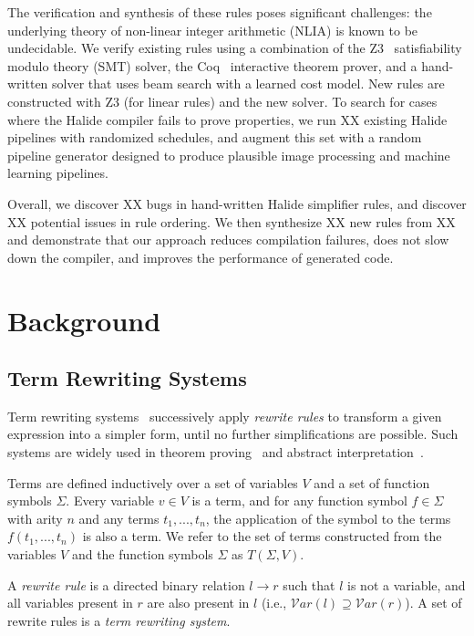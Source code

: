\documentclass[sigplan,review,anonymous]{acmart}\settopmatter{printfolios=true,printccs=false,printacmref=false}
\newcommand{\NumApps}{{\color{red} XX}\xspace}
\newcommand{\NumRulesFixed}{{\color{red} XX}\xspace}
\newcommand{\NumOrderingProblems}{{\color{red} XX}\xspace}
\newcommand{\NumRulesSynthesized}{{\color{red} XX}\xspace}
\newcommand{\NumFailureExamples}{{\color{red} XX}\xspace}
\begin{document}
The verification and synthesis
of these rules poses significant challenges: the underlying theory of non-linear integer arithmetic (NLIA)
is known to be undecidable.  We verify existing rules using a combination of the Z3~\cite{de2008z3} satisfiability
modulo theory (SMT) solver, the Coq~\cite{coq19} interactive theorem prover, and a hand-written solver
that uses beam search with a learned cost model.  New rules are constructed with Z3 (for linear rules)
and the new solver.  To search for cases where the Halide compiler fails to prove properties, we run
\NumApps existing Halide pipelines with randomized schedules, and augment this set with a random pipeline
generator designed to produce plausible image processing and machine learning pipelines.

Overall, we discover \NumRulesFixed bugs in hand-written Halide simplifier rules, and discover \NumOrderingProblems
potential issues in rule ordering.  We then synthesize \NumRulesSynthesized new rules from \NumFailureExamples and
demonstrate that our approach reduces compilation failures, does not slow down the compiler, and improves
the performance of generated code.

\section{Background}
\subsection{Term Rewriting Systems}
Term rewriting systems~\cite{gorn1967} successively apply \textit{rewrite rules} to transform a given
expression into a simpler form, until no further simplifications are possible.  Such systems are widely
used in theorem proving~\cite{} and abstract interpretation~\cite{}.

Terms are defined inductively over a set of variables $V$ and a set of function symbols $\Sigma$. Every variable $v \in V$ is a term, and for any function symbol $f \in \Sigma$ with arity $n$ and any terms $t_1, ..., t_n$, the application of the symbol to the terms $f(t_1, ..., t_n)$ is also a term. We refer to the set of terms constructed from the variables $V$ and the function symbols $\Sigma$ as $T(\Sigma, V)$.

A \emph{rewrite rule} is a directed binary relation $l \rightarrow r$ such that $l$ is not a variable, and all variables present in $r$ are also present in $l$ (i.e., $\mathcal{V}ar(l) \supseteq \mathcal{V}ar(r)$). A set of rewrite rules is a \emph{term rewriting system}.
\end{document}

